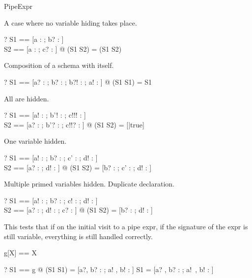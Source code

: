 \begin{zsection}
  \SECTION PipeExpr
\end{zsection}

A case where no variable hiding takes place.
\begin{zed}
  \vdash? \exists S1 == [a : \nat; b? : \nat]\\
                  S2 == [a : \nat; c? : \nat] @
                  (S1 \pipe S2) = (S1 \land S2)
\end{zed}

Composition of a schema with itself.
\begin{zed}
  \vdash? \exists S1 == [a? : \nat; b? : \nat; b?! : \nat; a! : \nat] @
                 (S1 \pipe S1) = S1
\end{zed}

All are hidden.
\begin{zed}
  \vdash? \exists S1 == [a! : \nat; b'! : \nat; c!!! : \nat]\\
                  S2 == [a? : \nat; b'? : \nat; c!!? : \nat] @
      (S1 \pipe S2) = [|true]
\end{zed}

One variable hidden.
\begin{zed}
  \vdash? \exists S1 == [a! : \nat; b? : \nat; c' : \nat; d! : \nat]\\
                  S2 == [a? : \nat; d! : \nat] @
      (S1 \pipe S2) = [b? : \nat; c' : \nat; d! : \nat]
\end{zed}

Multiple primed variables hidden.
Duplicate declaration.
\begin{zed}
  \vdash?
    \exists S1 == [a! : \nat; b? : \nat; c! : \nat; d! : \nat]\\
            S2 == [a? : \nat; d! : \nat; c? : \nat] @
      (S1 \pipe S2) = [b? : \nat; d! : \nat]
\end{zed}

This tests that if on the initial visit to a pipe expr, if the
signature of the expr is still variable, everything is still handled
correctly.

\begin{zed}
  g[X] == X
\end{zed}

\begin{zed}
  \vdash? \exists S1 == g @
             (S1 \pipe S1) = [a?, b? : \nat; a! , b! : \nat] \land
             S1 = [a? , b? : \nat; a!~, b! : \nat]\\
\end{zed}
